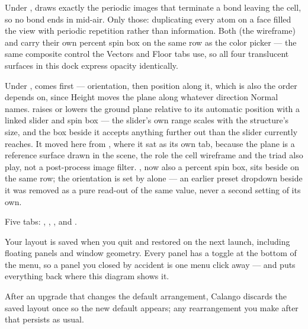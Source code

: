 \begin{description}
    Under ,  draws
    exactly the periodic images that terminate a bond leaving the cell, so no
    bond ends in mid-air. Only those: duplicating every atom on a face filled
    the view with periodic repetition rather than information. Both
     (the wireframe) and  carry their own
    percent  spin box on the same row as the color picker ---
    the same composite control the Vectors and Floor tabs use, so all four
    translucent surfaces in this dock express opacity identically.

    Under ,  comes first --- orientation, then position
    along it, which is also the order  depends on, since Height
    moves the plane along whatever direction Normal names. 
    raises or lowers the ground plane relative to its automatic position
    with a linked slider and spin box --- the slider's own range scales with
    the structure's size, and the box beside it accepts anything further out
    than the slider currently reaches. It moved here from , where it sat as its own tab, because the plane is a reference
    surface drawn in the scene, the role the cell wireframe and the triad
    also play, not a post-process image filter. , now also a
    percent spin box, sits beside  on the same row; the
    orientation is set by  alone --- an earlier  preset
    dropdown beside it was removed as a pure read-out of the same value,
    never a second setting of its own.
  \item[\ui{Visual Effects}] Five tabs: , , ,
     and .
\end{description}

\begin{caltip}
Your layout is saved when you quit and restored on the next launch, including
floating panels and window geometry. Every panel has a toggle at the bottom of
the  menu, so a panel you closed by accident is one menu click away
--- and \menusep{} puts everything back where this
diagram shows it.
\end{caltip}

\begin{calnote}
After an upgrade that changes the default arrangement, Calango discards the
saved layout once so the new default appears; any rearrangement you make after
that persists as usual.
\end{calnote}

